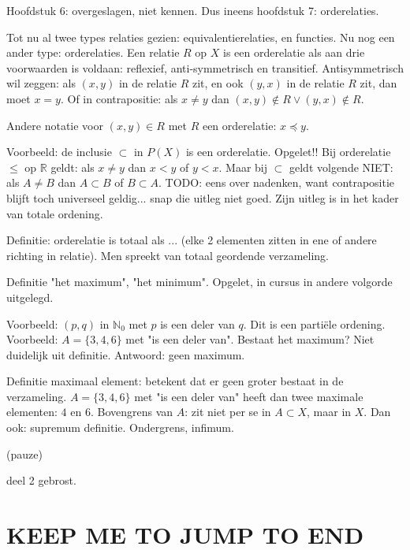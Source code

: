 \documentclass{article}
\begin{document}
Hoofdstuk 6: overgeslagen, niet kennen. Dus ineens hoofdstuk 7: orderelaties. 

Tot nu al twee types relaties gezien: equivalentierelaties, en functies. Nu nog een ander type: orderelaties. Een relatie $R$ op $X$ is een orderelatie als aan drie voorwaarden is voldaan: reflexief, anti-symmetrisch en transitief. Antisymmetrisch wil zeggen: als $(x,y)$ in de relatie $R$ zit, en ook $(y,x)$ in de relatie $R$ zit, dan moet $x=y$. Of in contrapositie: als $x \neq y$ dan $(x,y) \notin R \lor (y,x) \notin R$. 

Andere notatie voor $(x,y) \in  R$ met $R$ een orderelatie: $x \preceq y$. 

Voorbeeld: de inclusie $\subset$ in $P(X)$ is een orderelatie. Opgelet!! Bij orderelatie $\leq$ op $\mathbb{R}$ geldt: als $x \neq y$ dan $x < y$ of $y < x$. Maar bij $\subset$ geldt volgende NIET: als $A \neq B$ dan $A \subset B$ of $B \subset A$. TODO: eens over nadenken, want contrapositie blijft toch universeel geldig... snap die uitleg niet goed. Zijn uitleg is in het kader van totale ordening. 

Definitie: orderelatie is totaal als ... (elke 2 elementen zitten in ene of andere richting in relatie). Men spreekt van totaal geordende verzameling. 

Definitie "het maximum", "het minimum". Opgelet, in cursus in andere volgorde uitgelegd. 

Voorbeeld: $(p,q)$ in $\mathbb{N}_0$ met $p$ is een deler van $q$. Dit is een parti\"ele ordening. Voorbeeld: $A=\{3,4,6\}$ met "is een deler van". Bestaat het maximum? Niet duidelijk uit definitie. Antwoord: geen maximum. 

Definitie maximaal element: betekent dat er geen groter bestaat in de verzameling. 
$A=\{3,4,6\}$ met "is een deler van" heeft dan twee maximale elementen: $4$ en $6$. 
Bovengrens van $A$: zit niet per se in $A \subset X$, maar in $X$. Dan ook: supremum definitie. Ondergrens, infimum. 

(pauze)

deel 2 gebrost. 



\section{KEEP ME TO JUMP TO END}
\end{document}
